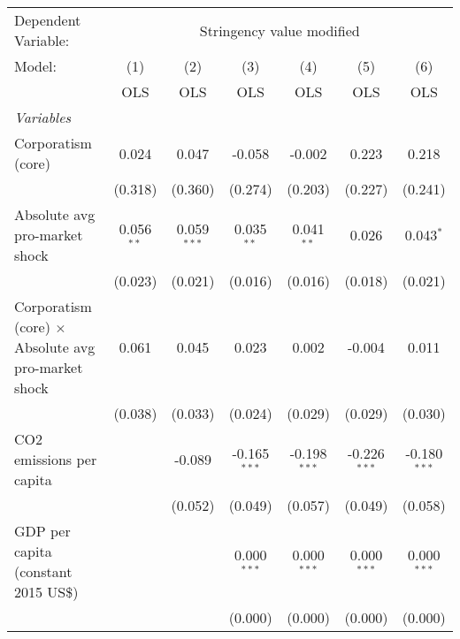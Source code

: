 
\begingroup
\centering
\begin{tabular}{lcccccc}
   \toprule
   Dependent Variable: & \multicolumn{6}{c}{Stringency value modified}\\
   Model:                                                     & (1)          & (2)           & (3)            & (4)            & (5)            & (6)\\  
                                                              &  OLS         & OLS           & OLS            & OLS            & OLS            & OLS\\  
   \midrule
   \emph{Variables}\\
   Corporatism (core)                                         & 0.024        & 0.047         & -0.058         & -0.002         & 0.223          & 0.218\\   
                                                              & (0.318)      & (0.360)       & (0.274)        & (0.203)        & (0.227)        & (0.241)\\   
   Absolute avg pro-market shock                              & 0.056$^{**}$ & 0.059$^{***}$ & 0.035$^{**}$   & 0.041$^{**}$   & 0.026          & 0.043$^{*}$\\   
                                                              & (0.023)      & (0.021)       & (0.016)        & (0.016)        & (0.018)        & (0.021)\\   
   Corporatism (core) $\times$ Absolute avg pro-market shock  & 0.061        & 0.045         & 0.023          & 0.002          & -0.004         & 0.011\\   
                                                              & (0.038)      & (0.033)       & (0.024)        & (0.029)        & (0.029)        & (0.030)\\   
   CO2 emissions per capita                                   &              & -0.089        & -0.165$^{***}$ & -0.198$^{***}$ & -0.226$^{***}$ & -0.180$^{***}$\\   
                                                              &              & (0.052)       & (0.049)        & (0.057)        & (0.049)        & (0.058)\\   
   GDP per capita (constant 2015 US\$)                        &              &               & 0.000$^{***}$  & 0.000$^{***}$  & 0.000$^{***}$  & 0.000$^{***}$\\   
                                                              &              &               & (0.000)        & (0.000)        & (0.000)        & (0.000)\\   

\end{tabular}
